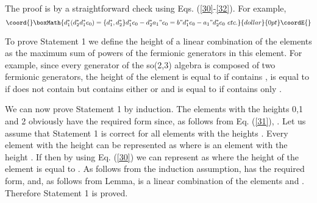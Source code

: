 \documentclass[a4paper,12pt]{article}%
\begin{document}
The proof is by a straightforward check using Eqs. 
(\ref{30}-\ref{32}). For example,
$$\coord{}\boxMath{d_1^*(d_2^*d_1^*e_0)=\{d_1^*,d_2^*\}d_1^*e_0-d_2^*a_1"e_0=
b"d_1^*e_0-a_1"d_2^*e_0\,\, etc.}{dollar}{0pt}\coordE{}$$

To prove Statement 1 we define the height of
a linear combination of the elements \coordHE{} as the
maximum sum of powers of the fermionic generators in this
element. For example, since every generator of the so(2,3)
algebra is composed of two fermionic generators, the height
of the element \coordHE{} is equal to \coordHE{} if \coordHE{}
contains \coordHE{}, is equal to \coordHE{} if \coordHE{} does 
not contain \coordHE{} but contains either \coordHE{} 
or \coordHE{} and is equal to \coordHE{} if \coordHE{} contains only \coordHE{}.

We can now prove Statement 1 by induction. The elements
with the heights 0,1 and 2 obviously have the required form
since, as follows from Eq. (\ref{31}),
\coordHE{}. Let us assume that
Statement 1
is correct for all elements with the heights \coordHE{}. 
Every element with the height \coordHE{} can be represented as
\coordHE{} where \coordHE{} is an element with the height \coordHE{}. 
If \coordHE{} then by using 
Eq. (\ref{30}) we can represent \coordHE{} as \coordHE{}
where the height of the element \coordHE{} is equal to \coordHE{}. 
As follows from the induction assumption, \coordHE{} has the required
form, and, as follows from Lemma, \coordHE{} is a linear
combination of the elements \coordHE{} and \coordHE{}. Therefore 
Statement 1 is proved.
\end{document}
